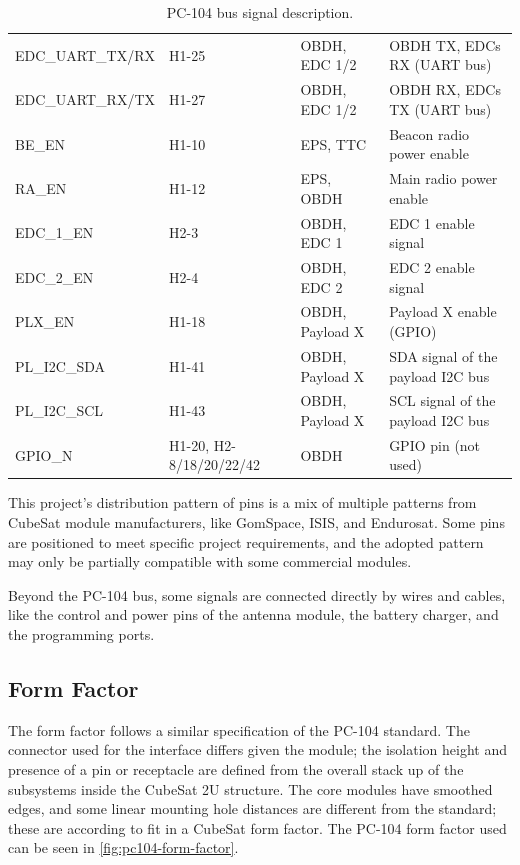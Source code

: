 \begin{table}[!h]
\begin{tabular}{lL{0.18\textwidth}L{0.17\textwidth}L{0.33\textwidth}}
        EDC\_UART\_TX/RX & H1-25           & OBDH, EDC 1/2        & OBDH TX, EDCs RX (UART bus) \\
        EDC\_UART\_RX/TX & H1-27           & OBDH, EDC 1/2        & OBDH RX, EDCs TX (UART bus) \\
        BE\_EN           & H1-10           & EPS, TTC             & Beacon radio power enable \\
        RA\_EN           & H1-12           & EPS, OBDH            & Main radio power enable \\
        EDC\_1\_EN       & H2-3            & OBDH, EDC 1          & EDC 1 enable signal \\
        EDC\_2\_EN       & H2-4            & OBDH, EDC 2          & EDC 2 enable signal \\
        PLX\_EN          & H1-18           & OBDH, Payload X      & Payload X enable (GPIO) \\
        PL\_I2C\_SDA     & H1-41           & OBDH, Payload X      & SDA signal of the payload I2C bus \\
        PL\_I2C\_SCL     & H1-43           & OBDH, Payload X      & SCL signal of the payload I2C bus \\
        GPIO\_N          & H1-20, H2-8/18/20/22/42  & OBDH        & GPIO pin (not used) \\
        \bottomrule[1.5pt]
    \end{tabular}
    \caption{PC-104 bus signal description.}
    \label{tab:pc104-signals}
\end{table}

This project's distribution pattern of pins is a mix of multiple patterns from CubeSat module manufacturers, like GomSpace, ISIS, and Endurosat. Some pins are positioned to meet specific project requirements, and the adopted pattern may only be partially compatible with some commercial modules.

Beyond the PC-104 bus, some signals are connected directly by wires and cables, like the control and power pins of the antenna module, the battery charger, and the programming ports.

\subsection{Form Factor}

The form factor follows a similar specification of the PC-104 standard\cite{pc104-specification}.
The connector used for the interface differs given the module; the isolation height and presence of a pin or receptacle are defined from the overall stack up of the subsystems inside the CubeSat 2U structure.
The core modules have smoothed edges, and some linear mounting hole distances are different from the standard; these are according to fit in a CubeSat form factor.
The PC-104 form factor used can be seen in \autoref{fig:pc104-form-factor}.

